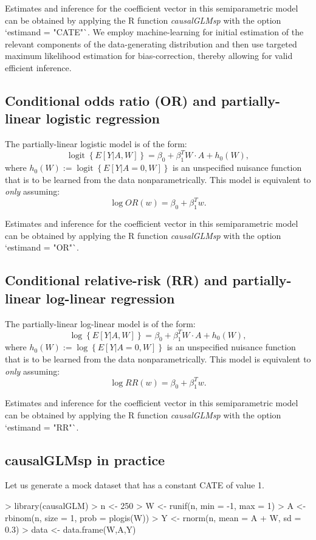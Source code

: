 \documentclass{article}
\DeclareMathOperator{\logit}{logit}
\begin{document}
Estimates and inference for the coefficient vector in this semiparametric model can be obtained by applying the R function \textit{causalGLMsp} with the option `estimand = "CATE"`. We employ machine-learning for initial estimation of the relevant components of the data-generating distribution and then use targeted maximum likelihood estimation for bias-correction, thereby allowing for valid efficient inference.
 
 
\subsection{Conditional odds ratio (OR) and partially-linear logistic regression}
The partially-linear logistic model is of the form:
$$\logit\left\{E[Y|A,W]\right\} = \beta_0 + \beta_1^T W \cdot A + h_0(W),$$
where $ h_0(W) := \logit\left\{E[Y|A=0,W]\right\}$ is an unspecified nuisance function that is to be learned from the data nonparametrically. This model is equivalent to \textit{only} assuming:
$$\log OR(w) = \beta_0 + \beta_1^T w.$$

Estimates and inference for the coefficient vector in this semiparametric model can be obtained by applying the R function \textit{causalGLMsp} with the option `estimand = "OR"`. 
 
 


\subsection{Conditional relative-risk (RR) and partially-linear log-linear regression}
The partially-linear log-linear model is of the form:
$$\log\left\{E[Y|A,W]\right\} = \beta_0 + \beta_1^T W \cdot A + h_0(W),$$
where $ h_0(W) := \log\left\{E[Y|A=0,W]\right\}$ is an unspecified nuisance function that is to be learned from the data nonparametrically. This model is equivalent to \textit{only} assuming:
$$\log RR(w) = \beta_0 + \beta_1^T w.$$


Estimates and inference for the coefficient vector in this semiparametric model can be obtained by applying the R function \textit{causalGLMsp} with the option `estimand = "RR"`.  


\subsection{causalGLMsp in practice}

Let us generate a mock dataset that has a constant CATE of value 1.
\begin{Schunk}
\begin{Sinput}
> library(causalGLM)
> n <- 250
> W <- runif(n, min = -1,  max = 1)
> A <- rbinom(n, size = 1, prob = plogis(W))
> Y <- rnorm(n, mean = A + W, sd = 0.3)
> data <- data.frame(W,A,Y)
\end{Sinput}
\end{Schunk}
\end{document}
